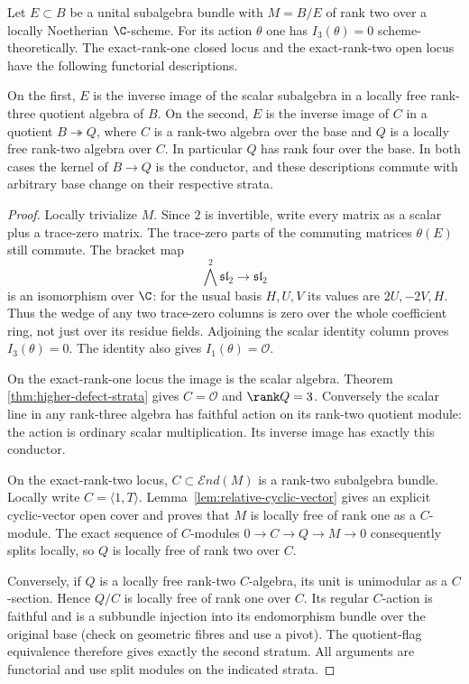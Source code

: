\begin{theorem}
\label{thm:codimension-two}
Let $E\subset B$ be a unital subalgebra bundle with $M=B/E$ of rank
two over a locally Noetherian $\C$-scheme. For its action $\theta$
one has $I_3(\theta)=0$ scheme-theoretically. The exact-rank-one
closed locus and the exact-rank-two open locus have the following
functorial descriptions.

On the first, $E$ is the inverse image of the scalar subalgebra in
a locally free rank-three quotient algebra of $B$.
On the second, $E$ is the inverse image of $C$ in a quotient
$B\twoheadrightarrow Q$, where $C$ is a rank-two algebra over the
base and $Q$ is a locally free rank-two algebra over $C$. In particular
$Q$ has rank four over the base. In both cases the kernel of
$B\to Q$ is the conductor, and these descriptions commute with
arbitrary base change on their respective strata.
\end{theorem}
\begin{proof}
Locally trivialize $M$. Since $2$ is invertible, write every matrix
as a scalar plus a trace-zero matrix. The trace-zero parts of the
commuting matrices $\theta(E)$ still commute. The bracket map
\[
 \bigwedge^2\mathfrak {sl}_2\longrightarrow\mathfrak {sl}_2
\]
is an isomorphism over $\C$: for the usual basis $H,U,V$ its values
are $2U,-2V,H$. Thus the wedge of any two trace-zero columns is zero
over the whole coefficient ring, not just over its residue fields.
Adjoining the scalar identity column proves $I_3(\theta)=0$.
The identity also gives $I_1(\theta)=\mathcal O$.

On the exact-rank-one locus the image is the scalar algebra. Theorem~
\ref{thm:higher-defect-strata} gives $C=\mathcal O$ and $\rank Q=3$.
Conversely the scalar line in any rank-three algebra has faithful
action on its rank-two quotient module: the action is ordinary scalar
multiplication. Its inverse image has exactly this conductor.

On the exact-rank-two locus, $C\subset\mathcal E nd(M)$ is a rank-two
subalgebra bundle. Locally write $C=\langle1,T\rangle$. Lemma~\ref{lem:relative-cyclic-vector}
gives an explicit cyclic-vector open cover and proves that $M$ is
locally free of rank one as a $C$-module. The exact sequence of $C$-modules
$0\to C\to Q\to M\to0$ consequently splits locally, so $Q$ is
locally free of rank two over $C$.

Conversely, if $Q$ is a locally free rank-two $C$-algebra, its unit
is unimodular as a $C$-section. Hence $Q/C$ is locally free of rank
one over $C$. Its regular $C$-action is faithful and is a subbundle
injection into its endomorphism bundle over the original base
(check on geometric fibres and use a pivot). The quotient-flag
equivalence therefore gives exactly the second stratum. All arguments
are functorial and use split modules on the indicated strata.
\end{proof}

